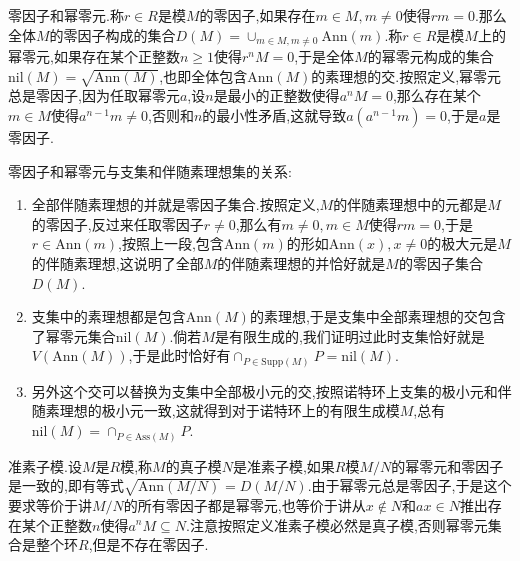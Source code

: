 零因子和幂零元.称$r\in R$是模$M$的零因子,如果存在$m\in M,m\not=0$使得$rm=0$.那么全体$M$的零因子构成的集合$D(M)=\cup_{m\in M,m\not=0}\mathrm{Ann}(m)$.称$r\in R$是模$M$上的幂零元,如果存在某个正整数$n\ge1$使得$r^nM=0$,于是全体$M$的幂零元构成的集合$\mathrm{nil}(M)=\sqrt{\mathrm{Ann}(M)}$,也即全体包含$\mathrm{Ann}(M)$的素理想的交.按照定义,幂零元总是零因子,因为任取幂零元$a$,设$n$是最小的正整数使得$a^nM=0$,那么存在某个$m\in M$使得$a^{n-1}m\not=0$,否则和$n$的最小性矛盾,这就导致$a(a^{n-1}m)=0$,于是$a$是零因子.

零因子和幂零元与支集和伴随素理想集的关系:
\begin{enumerate}
	\item 全部伴随素理想的并就是零因子集合.按照定义,$M$的伴随素理想中的元都是$M$的零因子,反过来任取零因子$r\not=0$,那么有$m\not=0,m\in M$使得$rm=0$,于是$r\in\mathrm{Ann}(m)$,按照上一段,包含$\mathrm{Ann}(m)$的形如$\mathrm{Ann}(x),x\not=0$的极大元是$M$的伴随素理想,这说明了全部$M$的伴随素理想的并恰好就是$M$的零因子集合$D(M)$.
	\item 支集中的素理想都是包含$\mathrm{Ann}(M)$的素理想,于是支集中全部素理想的交包含了幂零元集合$\mathrm{nil}(M)$.倘若$M$是有限生成的,我们证明过此时支集恰好就是$V(\mathrm{Ann}(M))$,于是此时恰好有$\cap_{P\in\mathrm{Supp}(M)}P=\mathrm{nil}(M)$.
	\item 另外这个交可以替换为支集中全部极小元的交,按照诺特环上支集的极小元和伴随素理想的极小元一致,这就得到对于诺特环上的有限生成模$M$,总有$\mathrm{nil}(M)=\cap_{P\in\mathrm{Ass}(M)}P$.
\end{enumerate}

准素子模.设$M$是$R$模,称$M$的真子模$N$是准素子模,如果$R$模$M/N$的幂零元和零因子是一致的,即有等式$\sqrt{\mathrm{Ann}(M/N)}=D(M/N)$.由于幂零元总是零因子,于是这个要求等价于讲$M/N$的所有零因子都是幂零元,也等价于讲从$x\not\in N$和$ax\in N$推出存在某个正整数$n$使得$a^nM\subseteq N$.注意按照定义准素子模必然是真子模,否则幂零元集合是整个环$R$,但是不存在零因子.


